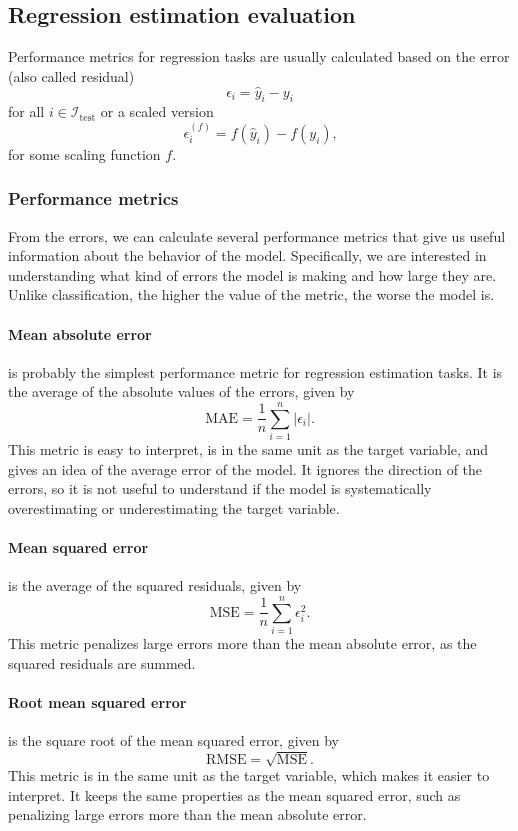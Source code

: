 \subsection{Regression estimation evaluation}

Performance metrics for regression tasks are usually calculated based on the error (also
called residual) $$\epsilon_i = \hat{y}_i - y_i$$ for all $i \in \mathcal{I}_\text{test}$ or
a scaled version $$\epsilon_i^{(f)} = f(\hat{y}_i) - f(y_i)\text{,}$$ for some scaling
function $f$.

\subsubsection{Performance metrics}

From the errors, we can calculate several performance metrics that give us useful
information about the behavior of the model.  Specifically, we are interested in
understanding what kind of errors the model is making and how large they are.  Unlike
classification, the higher the value of the metric, the worse the model is.

\paragraph{Mean absolute error} is probably the simplest performance metric for regression
estimation tasks.  It is the average of the absolute values of the errors,
given by
\begin{equation*}
  \text{MAE} = \frac{1}{n} \sum_{i=1}^n | \epsilon_i |\text{.}
\end{equation*}
This metric is easy to interpret, is in the same unit as the target variable, and gives an
idea of the average error of the model.  It ignores the direction of the errors, so it is
not useful to understand if the model is systematically overestimating or underestimating
the target variable.

\paragraph{Mean squared error} is the average of the squared residuals, given by
\begin{equation*}
  \text{MSE} = \frac{1}{n} \sum_{i=1}^n \epsilon_i^2\text{.}
\end{equation*}
This metric penalizes large errors more than the mean absolute error, as the squared
residuals are summed.

\paragraph{Root mean squared error} is the square root of the mean squared error, given by
\begin{equation*}
  \text{RMSE} = \sqrt{\text{MSE}}\text{.}
\end{equation*}
This metric is in the same unit as the target variable, which makes it easier to
interpret.  It keeps the same properties as the mean squared error, such as penalizing
large errors more than the mean absolute error.

